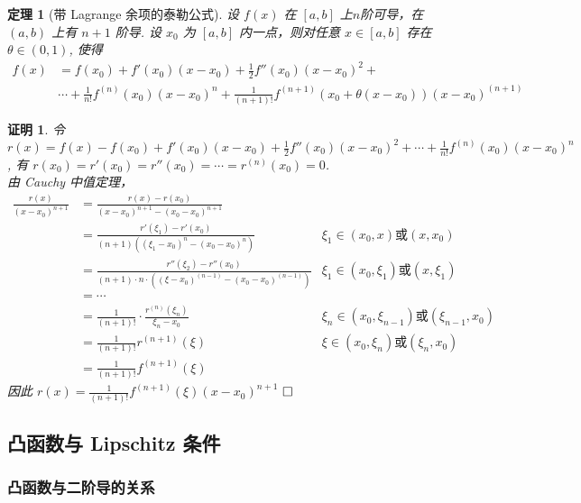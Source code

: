 \documentclass{ctexart}
\newcommand{\。}{．} %
\newenvironment{kuang3}{
    \begin{tcolorbox}[enhanced, colback=hlan!5!white, boxrule=0pt, frame hidden,
        borderline south={0.5mm}{0.1mm}{hlan}]
    }
    {\end{tcolorbox}}
\newenvironment{lanse}{
    \begin{tcolorbox}[enhanced, colback=qlan, boxrule=0pt, frame hidden,
        borderline west={0.7mm}{0.1mm}{slan}]
    }
    {\end{tcolorbox}}
\newenvironment{huangse}{
    \begin{tcolorbox}[enhanced, colback=qhuang, boxrule=0pt, frame hidden,
        borderline west={0.7mm}{0.1mm}{shuang}]
    }
    {\end{tcolorbox}}
\theoremstyle{t} %
\newtheorem{dlhj}{\color{shuang} 定理}[subsection]
\newtheorem*{zmhj}{\color{slan} 证明}
\newenvironment{zm}{\begin{lanse}\begin{zmhj}}{$\hfill \square$\end{zmhj}\end{lanse}}
\newenvironment{dl}{\begin{huangse}\begin{dlhj}}{\end{dlhj}\end{huangse}}
\begin{document}
\begin{dl}[带 Lagrange 余项的泰勒公式]
    设 $f(x)$ 在 $[a, b]$ 上$n$阶可导，在 $(a, b)$ 上有 $n + 1$ 阶导. 设 $x_0$ 为 $[a, b]$ 内一点，则对任意 $x \in [a, b]$ 存在 $\theta \in (0, 1)$, 使得
    \begin{align*}
        f(x) & = f(x_0) + f'(x_0)(x - x_0) + \frac{1}{2}f''(x_0)(x - x_0)^2 +  \\
        & \cdots + \frac{1}{n!}f^{(n)}(x_0)(x - x_0)^n + \frac{1}{(n + 1)!}f^{(n + 1)}(x_0 + \theta(x - x_0))(x - x_0)^{(n + 1)}
    \end{align*}
\end{dl}

\begin{zm}
    令 $r(x) = f(x) - f(x_0) + f'(x_0)(x - x_0) + \frac{1}{2}f''(x_0)(x - x_0)^2 + \cdots + \frac{1}{n!}f^{(n)}(x_0)(x - x_0)^n$, 有 $r(x_0) = r'(x_0) = r''(x_0) = \cdots = r^{(n)}(x_0) = 0$. \\
    由 Cauchy 中值定理，
    \begin{align*}
        \frac{r(x)}{(x - x_0)^{n + 1}} & = \frac{r(x) - r(x_0)}{(x - x_0)^{n + 1} - (x_0 - x_0)^{n + 1}} \\
        & = \frac{r'(\xi_1) - r'(x_0)}{(n + 1)((\xi_1 - x_0)^n - (x_0 - x_0)^n)} & \xi_1 \in (x_0, x) \text{或} (x, x_0) \\
        & =  \frac{r''(\xi_2) - r''(x_0)}{(n + 1)\cdot n\cdot ((\xi - x_0)^{(n - 1)} - (x_0 - x_0)^{(n - 1)})} & \xi_1 \in (x_0, \xi_1) \text{或} (x, \xi_1) \\
        & = \cdots \\
        & = \frac{1}{(n + 1)!}\cdot \frac{r^{(n)}(\xi_n)}{\xi_n - x_0} & \xi_n \in (x_0, \xi_{n - 1}) \text{或} (\xi_{n - 1}, x_0) \\
        & = \frac{1}{(n + 1)!}r^{(n + 1)}(\xi) & \xi \in (x_0, \xi_{n}) \text{或} (\xi_{n}, x_0) \\
        & = \frac{1}{(n + 1)!}f^{(n + 1)}(\xi)
    \end{align*}
    因此 $r(x) = \frac{1}{(n + 1)!}f^{(n + 1)}(\xi)(x - x_0)^{n + 1}$  
\end{zm}


\begin{kuang3}
    \subsection{凸函数与 Lipschitz 条件}
\end{kuang3}

\subsubsection{凸函数与二阶导的关系}
\end{document}
